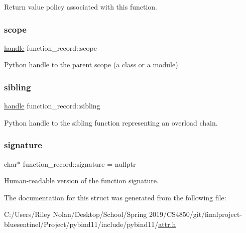 Return value policy associated with this function. 

\mbox{\label{structfunction__record_ad4112e6eb003c64f181968b2759a08af}} 
\subsubsection{\texorpdfstring{scope}{scope}}
{\footnotesize\ttfamily \mbox{\hyperlink{classhandle}{handle}} function\+\_\+record\+::scope}



Python handle to the parent scope (a class or a module) 

\mbox{\label{structfunction__record_a647a4421f0491047b6ea680efd2c0e45}} 
\subsubsection{\texorpdfstring{sibling}{sibling}}
{\footnotesize\ttfamily \mbox{\hyperlink{classhandle}{handle}} function\+\_\+record\+::sibling}



Python handle to the sibling function representing an overload chain. 

\mbox{\label{structfunction__record_aed1e3374bb684af2676d1aeb457c65b5}} 
\subsubsection{\texorpdfstring{signature}{signature}}
{\footnotesize\ttfamily char$\ast$ function\+\_\+record\+::signature = nullptr}



Human-\/readable version of the function signature. 



The documentation for this struct was generated from the following file\+:\begin{DoxyCompactItemize}
\item 
C\+:/\+Users/\+Riley Nolan/\+Desktop/\+School/\+Spring 2019/\+C\+S4850/git/finalproject-\/bluesentinel/\+Project/pybind11/include/pybind11/\mbox{\hyperlink{attr_8h}{attr.\+h}}\end{DoxyCompactItemize}
